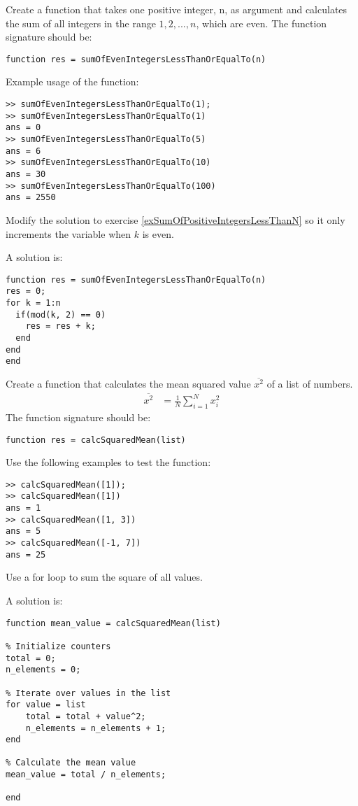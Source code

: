 \begin{ex}
Create a function that takes one positive integer, n, as argument and
calculates the sum of all integers in the range $1, 2, ..., n$, which are even.
The function signature should be:
\begin{lstlisting}
function res = sumOfEvenIntegersLessThanOrEqualTo(n)
\end{lstlisting}
Example usage of the function:
\begin{lstlisting}
>> sumOfEvenIntegersLessThanOrEqualTo(1);
>> sumOfEvenIntegersLessThanOrEqualTo(1)
ans = 0
>> sumOfEvenIntegersLessThanOrEqualTo(5)
ans = 6
>> sumOfEvenIntegersLessThanOrEqualTo(10)
ans = 30
>> sumOfEvenIntegersLessThanOrEqualTo(100)
ans = 2550
\end{lstlisting}
\begin{hint}
Modify the solution to exercise \ref{exSumOfPositiveIntegersLessThanN}
so it only increments the variable when $k$ is even.
\end{hint}
\begin{sol}
A solution is:
\begin{lstlisting}
function res = sumOfEvenIntegersLessThanOrEqualTo(n)
res = 0;
for k = 1:n
  if(mod(k, 2) == 0)
    res = res + k;
  end
end
end
\end{lstlisting}
\end{sol}
\end{ex}


\begin{ex}
\label{exCalcSquaredMean}%
Create a function that calculates the mean squared value $\overline{x^2}$ of a list of
numbers.
\begin{align}
\overline{x^2}
	& = \frac{1}{N} \sum_{i = 1}^{N} x_i^2
\end{align}
The function signature should be:
\begin{lstlisting}
function res = calcSquaredMean(list)
\end{lstlisting}
Use the following examples to test the function:
\begin{lstlisting}
>> calcSquaredMean([1]);
>> calcSquaredMean([1])
ans = 1
>> calcSquaredMean([1, 3])
ans = 5
>> calcSquaredMean([-1, 7])
ans = 25
\end{lstlisting}
\begin{hint}
Use a for loop to sum the square of all values.
\end{hint}
\begin{sol}
A solution is:
\begin{lstlisting}
function mean_value = calcSquaredMean(list)

% Initialize counters
total = 0;
n_elements = 0;

% Iterate over values in the list
for value = list
    total = total + value^2;
    n_elements = n_elements + 1;
end

% Calculate the mean value
mean_value = total / n_elements;

end
\end{lstlisting}
\end{sol}
\end{ex}




